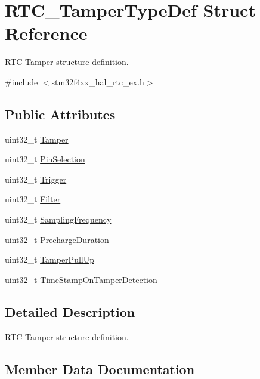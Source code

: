 \hypertarget{struct_r_t_c___tamper_type_def}{}\section{R\+T\+C\+\_\+\+Tamper\+Type\+Def Struct Reference}
\label{struct_r_t_c___tamper_type_def}


R\+TC Tamper structure definition.  




{\ttfamily \#include $<$stm32f4xx\+\_\+hal\+\_\+rtc\+\_\+ex.\+h$>$}

\subsection*{Public Attributes}
\begin{DoxyCompactItemize}
\item 
uint32\+\_\+t \hyperlink{struct_r_t_c___tamper_type_def_a72b82da6f13071bcc8cb68276daf3c5e}{Tamper}
\item 
uint32\+\_\+t \hyperlink{struct_r_t_c___tamper_type_def_a676c56a1ad581d88cf71b5b54d5f7075}{Pin\+Selection}
\item 
uint32\+\_\+t \hyperlink{struct_r_t_c___tamper_type_def_a0266f7aca365a9cf468cc2571d9f9395}{Trigger}
\item 
uint32\+\_\+t \hyperlink{struct_r_t_c___tamper_type_def_a41c032d76e9694654be4a80a572680c6}{Filter}
\item 
uint32\+\_\+t \hyperlink{struct_r_t_c___tamper_type_def_a1822a9001e16621e16cd87b065b92e2a}{Sampling\+Frequency}
\item 
uint32\+\_\+t \hyperlink{struct_r_t_c___tamper_type_def_ad447306575b3590e268fe3398f9bb517}{Precharge\+Duration}
\item 
uint32\+\_\+t \hyperlink{struct_r_t_c___tamper_type_def_a6e849894076222b74c7fa8430b6e176c}{Tamper\+Pull\+Up}
\item 
uint32\+\_\+t \hyperlink{struct_r_t_c___tamper_type_def_ae2685d2368c30ca2eeb3bd05c5094b2a}{Time\+Stamp\+On\+Tamper\+Detection}
\end{DoxyCompactItemize}


\subsection{Detailed Description}
R\+TC Tamper structure definition. 

\subsection{Member Data Documentation}
